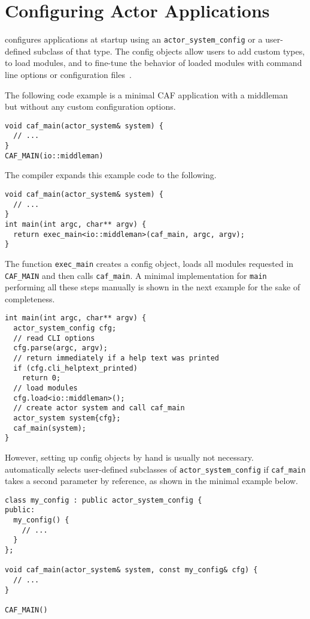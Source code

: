 \section{Configuring Actor Applications}
\label{system-config}

\lib configures applications at startup using an
\lstinline^actor_system_config^ or a user-defined subclass of that type. The
config objects allow users to add custom types, to load modules, and to
fine-tune the behavior of loaded modules with command line options or
configuration files~.

The following code example is a minimal CAF application with a
middleman~ but without any custom configuration options.

\begin{lstlisting}
void caf_main(actor_system& system) {
  // ...
}
CAF_MAIN(io::middleman)
\end{lstlisting}

The compiler expands this example code to the following.

\begin{lstlisting}
void caf_main(actor_system& system) {
  // ...
}
int main(int argc, char** argv) {
  return exec_main<io::middleman>(caf_main, argc, argv);
}
\end{lstlisting}

The function \lstinline^exec_main^ creates a config object, loads all modules
requested in \lstinline^CAF_MAIN^ and then calls \lstinline^caf_main^. A
minimal implementation for \lstinline^main^ performing all these steps manually
is shown in the next example for the sake of completeness.

\begin{lstlisting}
int main(int argc, char** argv) {
  actor_system_config cfg;
  // read CLI options
  cfg.parse(argc, argv);
  // return immediately if a help text was printed
  if (cfg.cli_helptext_printed)
    return 0;
  // load modules
  cfg.load<io::middleman>();
  // create actor system and call caf_main
  actor_system system{cfg};
  caf_main(system);
}
\end{lstlisting}

However, setting up config objects by hand is usually not necessary. \lib
automatically selects user-defined subclasses of
\lstinline^actor_system_config^ if \lstinline^caf_main^ takes a second
parameter by reference, as shown in the minimal example below.

\begin{lstlisting}
class my_config : public actor_system_config {
public:
  my_config() {
    // ...
  }
};

void caf_main(actor_system& system, const my_config& cfg) {
  // ...
}

CAF_MAIN()
\end{lstlisting}

